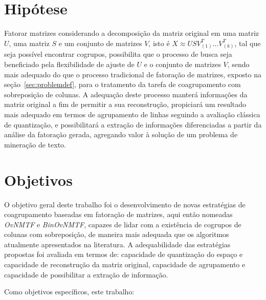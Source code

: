 \documentclass[
    12pt,                %
    oneside,            %
    a4paper,            %
    english,            %
    brazil                %
    ]{abntex2ppgsi}
\begin{document}


\section{Hipótese}

Fatorar matrizes considerando a decomposição da matriz original em uma matriz $U$, uma matriz $S$ e um conjunto de matrizes $V$, isto é $X \approx USV_{(1)}^T \dots V_{(k)}^T$, tal que seja possível encontrar cogrupos, possibilita que o processo de busca seja beneficiado pela flexibilidade de ajuste de $U$ e o conjunto de matrizes $V$, sendo mais adequado do que o processo tradicional de fatoração de matrizes, exposto na seção~\ref{sec:problemdef}, para o tratamento da tarefa de coagrupamento com sobreposição de colunas.
A adequação deste processo manterá informações da matriz original a fim de permitir a sua reconstrução, propiciará um resultado mais adequado em termos de agrupamento de linhas seguindo a avaliação clássica de quantização, e possibilitará a extração de informações diferenciadas a partir da análise da fatoração gerada, agregando valor à solução de um problema de mineração de texto.


\section{Objetivos}

O objetivo geral deste trabalho foi o desenvolvimento de novas estratégias de coagrupamento baseadas em fatoração de matrizes, aqui então nomeadas \textit{OvNMTF} e \textit{BinOvNMTF}, capazes de lidar com a existência de cogrupos de colunas com sobreposição, de maneira mais adequada que os algoritmos atualmente apresentados na literatura.
A adequabilidade das estratégias propostas foi avaliada em termos de: capacidade de quantização do espaço e capacidade de reconstrução da matriz original, capacidade de agrupamento e capacidade de possibilitar a extração de informação.

Como objetivos específicos, este trabalho:
\end{document}

